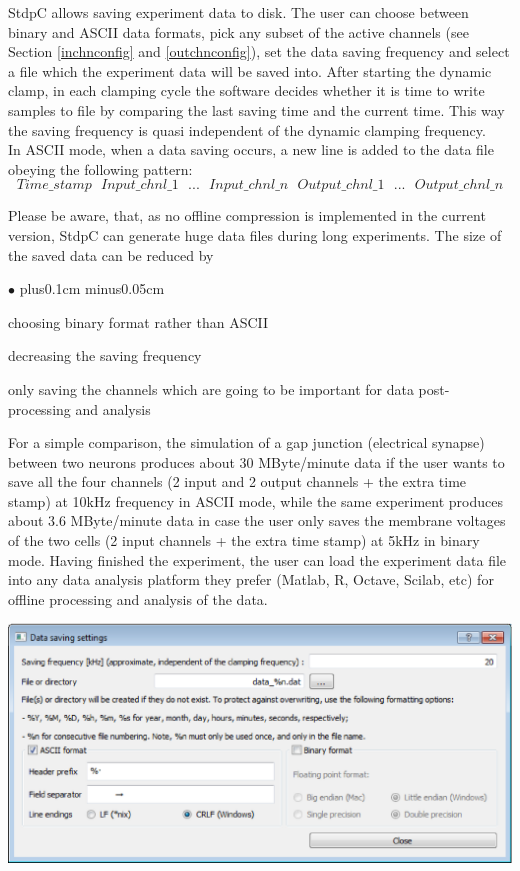 \documentclass{article}
\newenvironment{myitem}{\begin{list}{$\bullet$}{\setlength{\leftmargin}{1.1em}
\itemsep0.1cm plus0.1cm minus0.05cm
\listparindent0cm
\addtolength{\labelsep}{0.5\labelsep}
\setlength{\labelwidth}{0.8em}
\setlength{\leftmargin}{\labelwidth}
\addtolength{\leftmargin}{\labelsep}
}}{\end{list}}
\begin{document}
StdpC allows saving experiment data to disk.
The user can choose between binary and ASCII data formats, pick
any subset of the active channels (see Section \ref{inchnconfig} and
\ref{outchnconfig}), set the data saving frequency and select a file which the
experiment data will be saved into. After starting the dynamic clamp, in
each clamping cycle the software decides whether it is time to write samples
to file by comparing the last saving time and the current time. This way the
saving frequency is quasi independent of the dynamic clamping
frequency.\\
In ASCII mode, when a data saving occurs, a new line is added to the
data file obeying the following pattern:
\begin{equation*}
Time\_stamp\ \ \ Input\_chnl\_1
\ \ \ ...\ \ \ Input\_chnl\_n\ \ \  Output\_chnl\_1\ \ \ ...\ \ \ Output\_chnl\_n  
\end{equation*}

Please be aware, that, as no offline compression is implemented in the
current version, StdpC can generate huge data files during long
experiments. The size of the saved data can be reduced by
\begin{myitem} 
\item choosing binary format rather than ASCII
\item decreasing the saving frequency
\item only saving the channels which are going to be important for data
  post-processing and analysis
\end{myitem}

For a simple comparison, the simulation of a gap junction (electrical
synapse) between two neurons produces about 30 MByte/minute data if the
user wants to save all the four channels (2 input and 2 output channels
+ the extra time stamp) at 10kHz frequency in ASCII mode, while the same
experiment produces about 3.6 MByte/minute data in case the user only saves the
membrane voltages of the two cells (2 input channels + the extra time
stamp) at 5kHz in binary mode. 
Having finished the experiment, the user can load the experiment data file
into any data analysis platform they prefer (Matlab, R, Octave, Scilab,
etc) for offline processing and analysis of the data.


\noindent
\includegraphics[scale=0.6]{dataSavingDialog}\\
\end{document}
